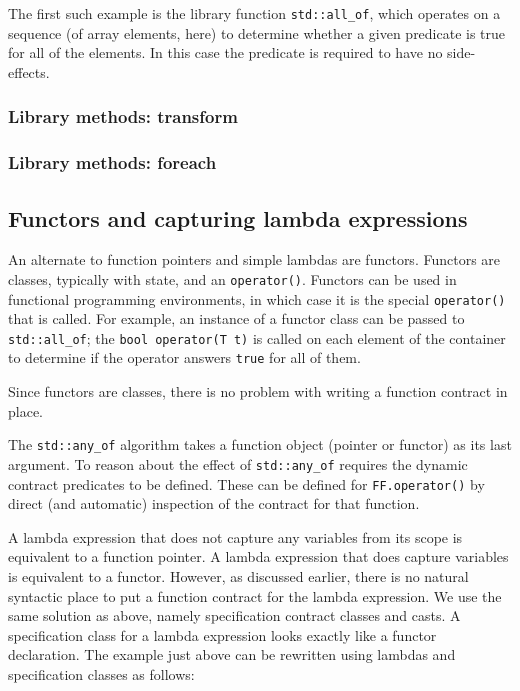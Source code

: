 The first such example is the library function \lstinline|std::all_of|,
which operates on a sequence (of array elements, here) to determine
whether a given predicate is true for all of the elements. In this
case the predicate is required to have no side-effects.

\TODO{}

\subsubsection{Library methods: transform}

\TODO{}

\subsubsection{Library methods: foreach}

\TODO{}

\subsection{Functors and capturing lambda expressions}
\label{sec:functors}

An alternate to function pointers and simple lambdas are functors. Functors are classes, typically with state, and an
\lstinline|operator()|. Functors can be used in functional programming environments, in which case it is the special
\lstinline|operator()| that is called. For example, an instance of a functor class can be passed to
\lstinline|std::all_of|; the \lstinline|bool operator(T t)| is called on each element of the container to determine if
the operator answers \lstinline|true| for all of them.

Since functors are classes, there is no problem with writing a function contract in place.



The \lstinline|std::any_of| algorithm takes a function object (pointer or functor) as its last argument. To reason about
the effect of \lstinline|std::any_of| requires the dynamic contract predicates to be defined. These can be defined for
\lstinline|FF.operator()| by direct (and automatic) inspection of the contract for that function.

A lambda expression that does not capture any variables from its scope is equivalent to a function pointer.
A lambda expression
that does capture variables is equivalent to a functor.
However, as discussed earlier, there is no natural syntactic place to
put a function contract for the lambda expression. We use the same solution as above, namely specification contract classes and casts.
A specification class for a lambda expression looks exactly like a functor declaration.
The example just above can be rewritten using lambdas and specification classes as follows:

